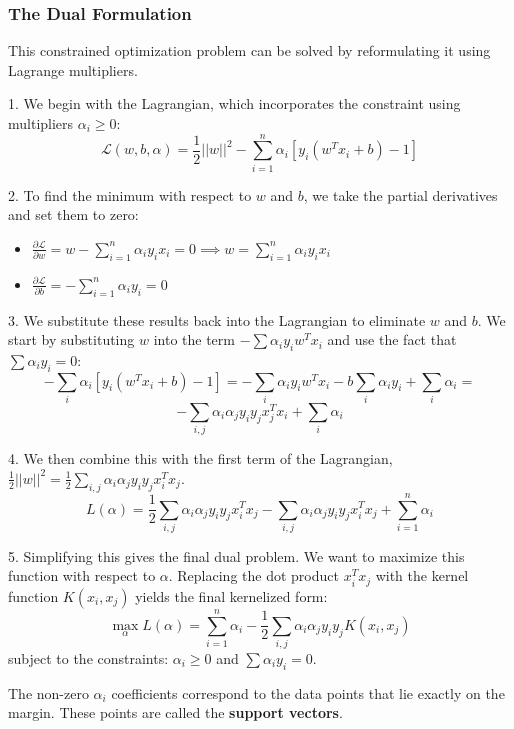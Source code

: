 \documentclass{article}
\begin{document}
\begin{multicols}{2}
	\subsubsection{The Dual Formulation}
	This constrained optimization problem can be solved by reformulating it using Lagrange multipliers.

	1.  We begin with the Lagrangian, which incorporates the constraint using multipliers $\alpha_i \ge 0$:
	$$\mathcal{L}(w, b, \alpha) = \frac{1}{2}||w||^{2} - \sum_{i=1}^{n}\alpha_{i}[y_{i}(w^{T}x_{i} + b) - 1]$$

	2.  To find the minimum with respect to $w$ and $b$, we take the partial derivatives and set them to zero:
	\begin{itemize}
		\item $\frac{\partial \mathcal{L}}{\partial w} = w - \sum_{i=1}^{n}\alpha_{i}y_{i}x_{i} = 0 \implies w = \sum_{i=1}^{n}\alpha_{i}y_{i}x_{i}$
		\item $\frac{\partial \mathcal{L}}{\partial b} = -\sum_{i=1}^{n}\alpha_{i}y_{i} = 0$
	\end{itemize}

	3.  We substitute these results back into the Lagrangian to eliminate $w$ and $b$. We start by substituting $w$ into the term $-\sum \alpha_i y_i w^T x_i$ and use the fact that $\sum \alpha_i y_i = 0$:
	$$-\sum_{i}\alpha_{i}[y_{i}(w^{T}x_{i} + b) - 1] = -\sum_{i}\alpha_{i}y_{i}w^{T}x_{i} - b\sum_{i}\alpha_{i}y_{i} + \sum_{i}\alpha_{i} =$$
	$$-\sum_{i,j} \alpha_{i}\alpha_{j}y_{i}y_{j}x_{j}^T x_i + \sum_{i}\alpha_{i}$$


	4.  We then combine this with the first term of the Lagrangian, $\frac{1}{2}||w||^2 = \frac{1}{2} \sum_{i,j} \alpha_{i}\alpha_{j}y_{i}y_{j}x_{i}^T x_{j}$.
	$$L(\alpha) = \frac{1}{2} \sum_{i,j} \alpha_{i}\alpha_{j}y_{i}y_{j}x_{i}^T x_{j} - \sum_{i,j} \alpha_{i}\alpha_{j}y_{i}y_{j}x_{i}^T x_{j} + \sum_{i=1}^{n} \alpha_i$$


	5.  Simplifying this gives the final dual problem. We want to maximize this function with respect to $\alpha$. Replacing the dot product $x_i^T x_j$ with the kernel function $K(x_i, x_j)$ yields the final kernelized form:
	$$\max_{\alpha} L(\alpha) = \sum_{i=1}^{n} \alpha_i - \frac{1}{2} \sum_{i,j} \alpha_i \alpha_j y_i y_j K(x_i, x_j)$$
	subject to the constraints: $\alpha_i \ge 0$ and $\sum \alpha_i y_i = 0$.

	The non-zero $\alpha_i$ coefficients correspond to the data points that lie exactly on the margin. These points are called the \textbf{support vectors}.


\end{multicols}
\end{document}
